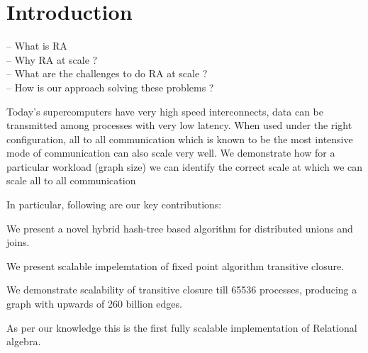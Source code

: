 

\section{Introduction}
\label{sec:intro}
%


-- What is RA \\
-- Why RA at scale ? \\
-- What are the challenges to do RA at scale ? \\
-- How is our approach solving these problems ?

Today's supercomputers have very high speed interconnects, data can be transmitted among processes with very low latency. 
When used under the right configuration, all to all communication which is known to be the most intensive mode of communication can also scale very well.
We demonstrate how for a particular workload (graph size) we can identify the correct scale at which we can scale all to all communication

In particular, following are our key contributions:
\begin{tightenumerate}
	\item We present a novel hybrid hash-tree based algorithm for distributed unions and joins.
	\item We present scalable impelemtation of fixed point algorithm transitive closure.
	\item We demonstrate scalability of transitive closure till 65536 processes, producing a graph with upwards of 260 billion edges. 
\end{tightenumerate}

As per our knowledge this is the first fully scalable implementation of Relational algebra.


